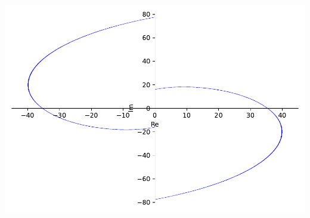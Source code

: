 \documentclass[
]{book}
\theoremstyle{definition}
\theoremstyle{definition}
\theoremstyle{definition}
\theoremstyle{definition}
\theoremstyle{remark}
\begin{document}
\includegraphics{ConformalMapping_files/figure-latex/unnamed-chunk-62-11.pdf}
\end{document}
